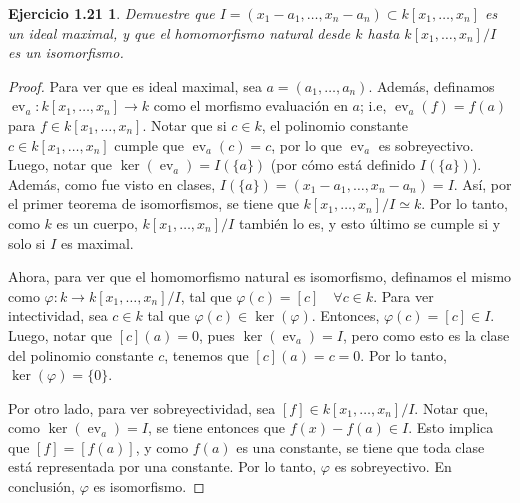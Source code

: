 \documentclass{amsart}
\theoremstyle{plain}
\newtheorem*{ejercicio5}{Ejercicio 1.21}
\DeclareMathOperator{\ev}{ev}
\begin{document}
	\begin{ejercicio5}
		Demuestre que $I = (x_{1} - a_{1}, \dots, x_{n} - a_{n}) \subset k[x_{1},\dots,x_{n}]$ es un ideal maximal, y que el homomorfismo natural desde $k$ hasta $k[x_{1},\dots,x_{n}] \slash I$ es un isomorfismo.
	\end{ejercicio5}
	\begin{proof}
		Para ver que es ideal maximal, sea $a = (a_{1},\dots,a_{n})$. Además, definamos $\ev_{a} \colon k[x_{1},\dots,x_{n}] \to k$ como el morfismo evaluación en $a$; i.e, $\ev_{a}(f) = f(a)$ para $f \in k[x_{1},\dots,x_{n}]$. Notar que si $c \in k$, el polinomio constante $c \in k[x_{1},\dots,x_{n}]$ cumple que $\ev_{a}(c) = c$, por lo que $\ev_{a}$ es sobreyectivo. Luego, notar que $\ker(\ev_{a}) = I(\{a\})$ (por cómo está definido $I(\{a\})$). Además, como fue visto en clases, $I(\{a\}) = (x_{1} - a_{1}, \dots, x_{n} - a_{n}) = I$. Así, por el primer teorema de isomorfismos, se tiene que $k[x_{1},\dots,x_{n}] \slash I \simeq k$. Por lo tanto, como $k$ es un cuerpo, $k[x_{1},\dots,x_{n}] \slash I$ también lo es, y esto último se cumple si y solo si $I$ es maximal. \par
		Ahora, para ver que el homomorfismo natural es isomorfismo, definamos el mismo como $\varphi \colon k \to k[x_{1},\dots,x_{n}] \slash I$, tal que $\varphi(c) = [c] \quad \forall c \in k$. Para ver intectividad, sea $c \in k$ tal que $\varphi(c) \in \ker(\varphi)$. Entonces, $\varphi(c) = [c] \in I$. Luego, notar que $[c](a) = 0$, pues $\ker(\ev_{a}) = I$, pero como esto es la clase del polinomio constante $c$, tenemos que $[c](a) = c = 0$. Por lo tanto, $\ker(\varphi) = \{0\}$. \par
		Por otro lado, para ver sobreyectividad, sea $[f] \in k[x_{1},\dots,x_{n}] \slash I$. Notar que, como $\ker(\ev_{a}) = I$, se tiene entonces que $f(x) - f(a) \in I$. Esto implica que $[f] = [f(a)]$, y como $f(a)$ es una constante, se tiene que toda clase está representada por una constante. Por lo tanto, $\varphi$ es sobreyectivo. En conclusión, $\varphi$ es isomorfismo.
	\end{proof}
\end{document}
